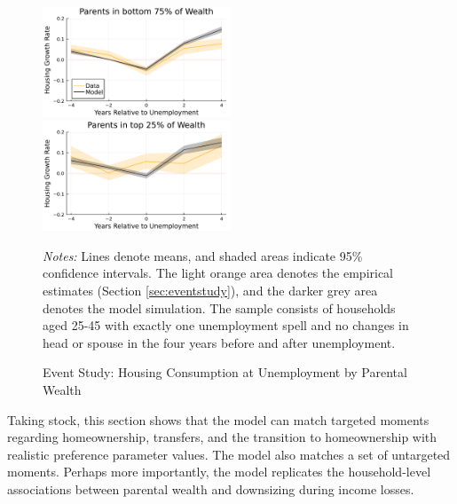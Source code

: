 \documentclass[12pt]{article}
\begin{document}
\begin{figure}
	\caption{Event Study: Housing Consumption at Unemployment by Parental Wealth}\label{fig:housinggrowthrates_model}
	\includegraphics[width=0.5\textwidth]{../tabfig/model_housinggrowthpoor_both}%
	\includegraphics[width=0.5\textwidth]{../tabfig/model_housinggrowthrich_both}
	
	{\begin{footnotesize} \textit{Notes:} Lines denote means, and shaded areas indicate 95\% confidence intervals. The light orange area denotes the empirical estimates (Section \ref{sec:eventstudy}), and the darker grey area denotes the model simulation. The sample consists of households aged 25-45 with exactly one unemployment spell and no changes in head or spouse in the four years before and after unemployment. \end{footnotesize}}
\end{figure}

Taking stock, this section shows that the model can match targeted moments regarding homeownership, transfers, and the transition to homeownership with realistic preference parameter values. The model also matches a set of untargeted moments. Perhaps more importantly, the model replicates the household-level associations between parental wealth and downsizing during income losses. 
\end{document}

